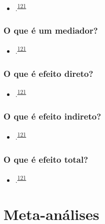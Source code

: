 \documentclass[
]{book}
\providecommand{\tightlist}{%
  \setlength{\itemsep}{0pt}\setlength{\parskip}{0pt}}
\begin{document}
\begin{itemize}
\tightlist
\item
  .\textsuperscript{\protect\hyperlink{ref-Bours2023}{121}}
\end{itemize}

\hypertarget{o-que-uxe9-um-mediador}{%
\subsection{O que é um mediador?}\label{o-que-uxe9-um-mediador}}

\begin{itemize}
\tightlist
\item
  .\textsuperscript{\protect\hyperlink{ref-Bours2023}{121}}
\end{itemize}

\hypertarget{o-que-uxe9-efeito-direto}{%
\subsection{O que é efeito direto?}\label{o-que-uxe9-efeito-direto}}

\begin{itemize}
\tightlist
\item
  .\textsuperscript{\protect\hyperlink{ref-Bours2023}{121}}
\end{itemize}

\hypertarget{o-que-uxe9-efeito-indireto}{%
\subsection{O que é efeito indireto?}\label{o-que-uxe9-efeito-indireto}}

\begin{itemize}
\tightlist
\item
  .\textsuperscript{\protect\hyperlink{ref-Bours2023}{121}}
\end{itemize}

\hypertarget{o-que-uxe9-efeito-total}{%
\subsection{O que é efeito total?}\label{o-que-uxe9-efeito-total}}

\begin{itemize}
\tightlist
\item
  .\textsuperscript{\protect\hyperlink{ref-Bours2023}{121}}
\end{itemize}

\hypertarget{meta-analises}{%
\chapter{\texorpdfstring{\textbf{Meta-análises}}{Meta-análises}}\label{meta-analises}}
\end{document}
